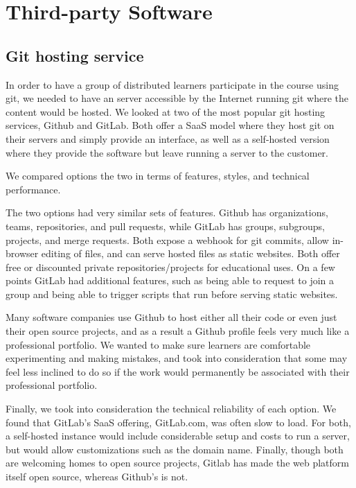 \documentclass[12pt,twoside,vi]{mitthesis}
\begin{document}
\section{Third-party Software}

\subsection{Git hosting service}

In order to have a group of distributed learners participate in the course using git, we needed to have an server accessible by the Internet running git where the content would be hosted. We looked at two of the most popular git hosting services, Github and GitLab. Both offer a SaaS model where they host git on their servers and simply provide an interface, as well as a self-hosted version where they provide the software but leave running a server to the customer.

We compared options the two in terms of features, styles, and technical performance.

The two options had very similar sets of features. Github has organizations, teams, repositories, and pull requests, while GitLab has groups, subgroups, projects, and merge requests. Both expose a webhook for git commits, allow in-browser editing of files, and can serve hosted files as static websites. Both offer free or discounted private repositories/projects for educational uses. On a few points GitLab had additional features, such as being able to request to join a group and being able to trigger scripts that run before serving static websites.

Many software companies use Github to host either all their code or even just their open source projects, and as a result a Github profile feels very much like a professional portfolio. We wanted to make sure learners are comfortable experimenting and making mistakes, and took into consideration that some may feel less inclined to do so if the work would permanently be associated with their professional portfolio. 

Finally, we took into consideration the technical reliability of each option. We found that GitLab’s SaaS offering, GitLab.com, was often slow to load. For both, a self-hosted instance would include considerable setup and costs to run a server, but would allow customizations such as the domain name. Finally, though both are welcoming homes to open source projects, Gitlab has made the web platform itself open source, whereas Github’s is not.
\end{document}
